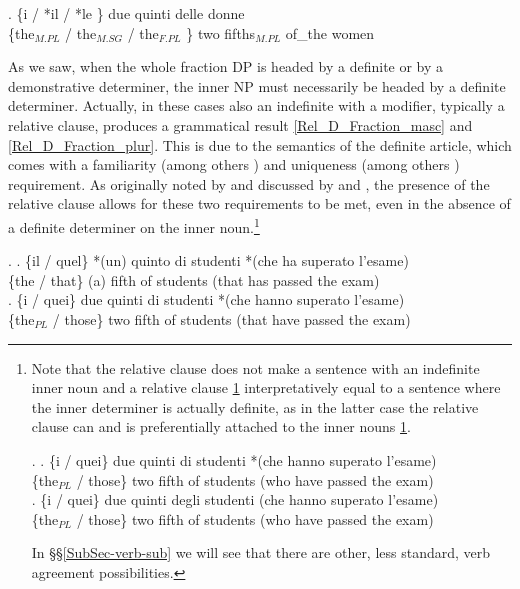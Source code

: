 \documentclass[charis, linguex]{glossa}
\begin{document}
	  \exg. \{i / *il / *le \} due quinti delle donne\\
	  	  \{the$_{M.PL}$ / the$_{M.SG}$ / the$_{F.PL}$ \} two fifths$_{M.PL}$  of\_the women\\  \label{duequinti}


As we saw, when the whole fraction DP is headed by a definite or by a demonstrative determiner, the inner NP must necessarily be headed by a definite determiner. Actually, in these cases also an indefinite with a modifier, typically a relative clause, produces a grammatical result \ref{Rel_D_Fraction_masc} and \ref{Rel_D_Fraction_plur}. This is due to the semantics of the definite article, which comes with a familiarity (among others \citealt{hei82}) and uniqueness (among others \citealt{rus05}) requirement. As originally noted by \citet[Ch.8]{kay94} and discussed by \citet{bar98} and \citet{zam98}, the presence of the relative clause allows for these two requirements to be met, even in the absence of a definite determiner on the inner noun.\footnote{Note that the relative clause does not make a sentence with an indefinite inner noun and a relative clause \ref{Rel_D_Fraction_plur_footnote1} interpretatively equal to a sentence where the inner determiner is actually definite, as in the latter case the relative clause can and is preferentially attached to the inner nouns \ref{Rel_D_Fraction_plur_footnote2}. 

\ex. \ag. \{i / quei\} due quinti di  studenti *(che hanno superato l'esame)  \\
      \{the$_{PL}$ / those\} two fifth of students (who have passed {the exam}) \\ \label{Rel_D_Fraction_plur_footnote1}	  
     \bg. \{i / quei\} due quinti degli  studenti (che hanno superato l'esame)  \\
	        \{the$_{PL}$ / those\} two fifth of students (who have passed {the exam}) \\ \label{Rel_D_Fraction_plur_footnote2}

In \S\S\ref{SubSec-verb-sub} we will see that there are other, less standard, verb agreement possibilities. 	
}

\ex. \label{Rel_D} \ag. \{il / quel\} *(un) quinto di studenti *(che ha superato l'esame)  \\
      \{the / that\} (a) fifth of students (that has passed {the exam}) \\ \label{Rel_D_Fraction_masc}
	 \bg. \{i / quei\} due quinti di  studenti *(che hanno superato l'esame)  \\
      \{the$_{PL}$ / those\} two fifth of students (that have passed {the exam}) \\ \label{Rel_D_Fraction_plur}
	  
\end{document}
